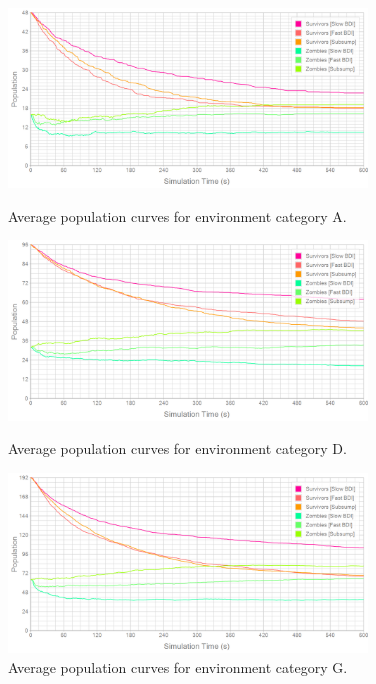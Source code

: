 \documentclass[a4paper,12pt]{article}
\begin{document}
\begin{figure}
\vspace{-20mm}
\centering
\includegraphics[width=0.85\textwidth]{../../Results/64_48_16/population}
\caption{\small Average population curves for environment category A.}
\label{fig:64_48_16_pop}

\vspace{5mm}
\includegraphics[width=0.85\textwidth]{../../Results/128_96_32/population}
\caption{\small Average population curves for environment category D.}
\label{fig:64_96_32_pop}

\vspace{5mm}
\includegraphics[width=0.85\textwidth]{../../Results/128_192_64/population}
\caption{\small Average population curves for environment category G.}
\label{fig:128_192_64_pop}
\end{figure}
\end{document}
